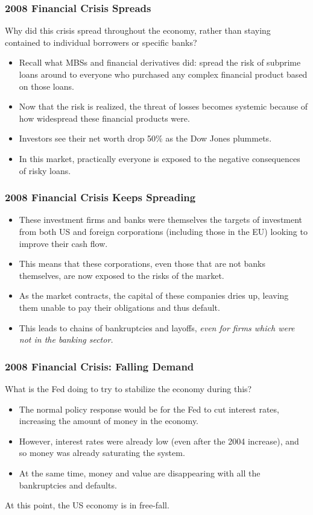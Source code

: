 \documentclass{beamer}
\begin{document}
\begin{frame} 
	\frametitle{\LARGE{2008 Financial Crisis Spreads}}
	Why did this crisis spread throughout the economy, rather than staying contained to individual borrowers or specific banks?
	\begin{itemize}
		\item Recall what MBSs and financial derivatives did: spread the risk of subprime loans around to everyone who purchased any complex financial product based on those loans. \pause
		\item Now that the risk is realized, the threat of losses becomes systemic because of how widespread these financial products were.
		\item Investors see their net worth drop 50\% as the Dow Jones plummets. \pause
		\item In this market, practically everyone is exposed to the negative consequences of risky loans.
	\end{itemize}
\end{frame}

\begin{frame} 
	\frametitle{\LARGE{2008 Financial Crisis Keeps Spreading}}
	\begin{itemize}
		\item These investment firms and banks were themselves the targets of investment from both US and foreign corporations (including those in the EU) looking to improve their cash flow. \pause
		\item This means that these corporations, even those that are not banks themselves, are now exposed to the risks of the market.
		\item As the market contracts, the capital of these companies dries up, leaving them unable to pay their obligations and thus default.
		\item This leads to chains of bankruptcies and layoffs, \textit{even for firms which were not in the banking sector.}
	\end{itemize}
\end{frame}

\begin{frame} 
	\frametitle{\LARGE{2008 Financial Crisis: Falling Demand}}
	What is the Fed doing to try to stabilize the economy during this?
	\begin{itemize}
		\item The normal policy response would be for the Fed to cut interest rates, increasing the amount of money in the economy. \pause
		\item However, interest rates were already low (even after the 2004 increase), and so money was already saturating the system. \pause
		\item At the same time, money and value are disappearing with all the bankruptcies and defaults. 
	\end{itemize}
	At this point, the US economy is in free-fall.
\end{frame}
\end{document}

